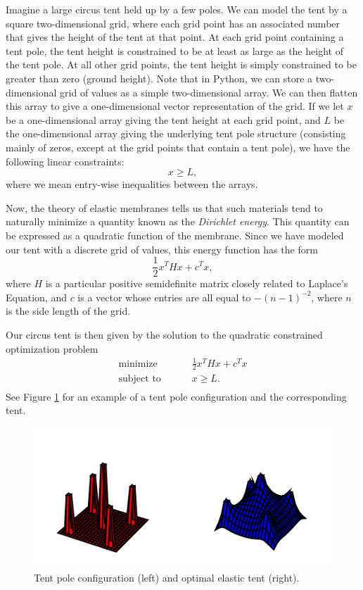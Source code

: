 Imagine a large circus tent held up by a few poles. We can model the tent by a square two-dimensional grid,
where each grid point has an associated number that gives the height of the tent at that point. At each
grid point containing a tent pole, the tent height is constrained to be at least as large as the height of
the tent pole. At all other grid points, the tent height is simply constrained to be greater than zero (ground height).
Note that in Python, we can store a two-dimensional grid of values as a simple two-dimensional array.
We can then flatten this array to give a one-dimensional vector representation of the grid.
If we let $x$ be a one-dimensional array giving the tent height at each grid point, and $L$ be the one-dimensional
array giving the underlying tent pole structure (consisting mainly of zeros, except at the grid points that contain
a tent pole), we have the following linear constraints:
\[
x \geq L,
\]
where we mean entry-wise inequalities between the arrays.

Now, the theory of elastic membranes tells us that such materials tend to naturally minimize a quantity known
as the \emph{Dirichlet energy}. This quantity can be expressed as a quadratic function of the membrane.
Since we have modeled our tent with a discrete grid of values, this energy function has the form
\[
\frac{1}{2}x^T H x + c^T x,
\]
where $H$ is a particular positive semidefinite matrix closely related to Laplace's Equation, and $c$ is a
vector whose entries are all equal to $-(n-1)^{-2}$, where $n$ is the side length of the grid.

Our circus tent is then given by the solution to the quadratic constrained optimization problem
\begin{align*}
\text{minimize }\qquad &\frac{1}{2}x^T H x + c^T x\\
\text{subject to }\qquad &x \geq L.\\
\end{align*}
See Figure \ref{fig:tent} for an example of a tent pole configuration and the corresponding tent.

\begin{figure}
\includegraphics[width=\textwidth]{tent.pdf}
\caption{Tent pole configuration (left) and optimal elastic tent (right).}
\label{fig:tent}
\end{figure}

